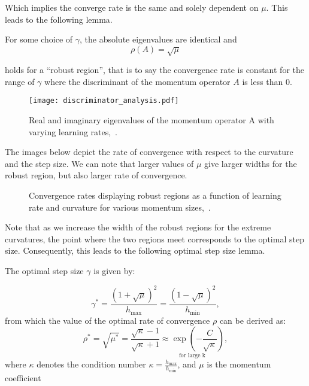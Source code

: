 \documentclass{article}
\begin{document}
Which implies the converge rate is the same and solely dependent on $\mu$. This leads to the following lemma.

\begin{lemma} 
For some choice of $\gamma$, the absolute eigenvalues are identical and
\[
\rho(A) = \sqrt{\mu}
\]

holds for a ``robust region'', that is to say the convergence rate is constant for the range of $\gamma$ where the discriminant of the momentum operator $A$ is less than 0.
\end{lemma}

\begin{figure}[H]%
\centering
\texttt{[image: discriminator\_analysis.pdf]}%
\caption{Real and imaginary eigenvalues of the momentum operator A with varying learning rates,~\cite{mitliagkas2019interesting}.}
\label{fig:robust_region}%
\end{figure}


The images below depict the rate  of convergence with respect to the curvature and the step size. We can note that larger values of $\mu$ give larger widths for the robust region, but also larger rate of convergence.
\begin{figure}[H]%
\centering
{}%
\qquad
{}%
\caption{Convergence rates displaying robust regions as a function of learning rate and curvature for various momentum sizes,~\cite{mitliagkas2019interesting}.}
\end{figure}



Note that as we increase the width of the robust regions for the extreme curvatures, the point where the two regions meet corresponds to the optimal step size. Consequently, this leads to the following optimal step size lemma.

\begin{lemma}
The optimal step size $\gamma$ is given by:
  
\begin{equation}
\gamma^* = \frac{(1 + \sqrt{\mu})^2}{h_{\max}} = \frac{(1 - \sqrt{\mu})^2}{h_{\min}},
\end{equation}
from which the value of the optimal rate of convergence $\rho$ can be derived as:
\begin{equation}
\rho^* = \sqrt{\mu^*} = \frac{\sqrt{\kappa} - 1}{\sqrt{\kappa} + 1} \underset{\text{for\ large\ k}}{\approx \exp(-\frac{C}{\sqrt{\kappa}})},
\end{equation}
where $\kappa$ denotes the condition number $\kappa=\frac{h_{\max}}{h_{\min}}$, and $\mu$ is the momentum coefficient
\end{lemma}
\end{document}
